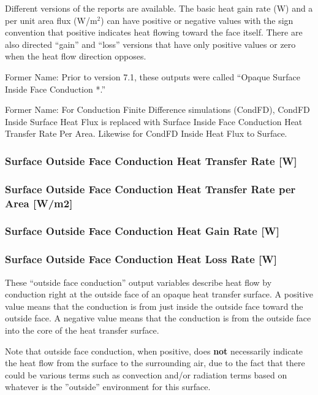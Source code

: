 Different versions of the reports are available. The basic heat gain rate (W) and a per unit area flux (W/m\(^{2}\)) can have positive or negative values with the sign convention that positive indicates heat flowing toward the face itself. There are also directed ``gain'' and ``loss'' versions that have only positive values or zero when the heat flow direction opposes.

Former Name: Prior to version 7.1, these outputs were called ``Opaque Surface Inside Face Conduction *.''

Former Name: For Conduction Finite Difference simulations (CondFD), CondFD Inside Surface Heat Flux is replaced with Surface Inside Face Conduction Heat Transfer Rate Per Area. Likewise for CondFD Inside Heat Flux to Surface.

\subsubsection{Surface Outside Face Conduction Heat Transfer Rate {[}W{]}}\label{surface-outside-face-conduction-heat-transfer-rate-w}

\subsubsection{Surface Outside Face Conduction Heat Transfer Rate per Area {[}W/m2{]}}\label{surface-outside-face-conduction-heat-transfer-rate-per-area-wm2}

\subsubsection{Surface Outside Face Conduction Heat Gain Rate {[}W{]}}\label{surface-outside-face-conduction-heat-gain-rate-w}

\subsubsection{Surface Outside Face Conduction Heat Loss Rate {[}W{]}}\label{surface-outside-face-conduction-heat-loss-rate-w}

These ``outside face conduction'' output variables describe heat flow by conduction right at the outside face of an opaque heat transfer surface. A positive value means that the conduction is from just inside the outside face toward the outside face. A negative value means that the conduction is from the outside face into the core of the heat transfer surface.

Note that outside face conduction, when positive, does \textbf{not} necessarily indicate the heat flow from the surface to the surrounding air, due to the fact that there could be various terms such as convection and/or radiation terms based on whatever is the ''outside'' environment for this surface.

